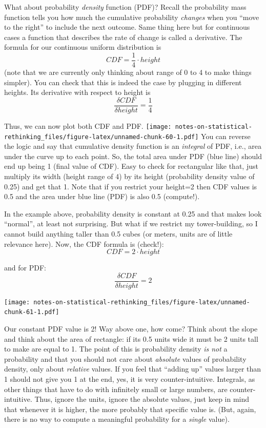 \documentclass[
]{book}
\begin{document}
What about probability \emph{density} function (PDF)? Recall the probability mass function tells you how much the cumulative probability \emph{changes} when you ``move to the right'' to include the next outcome. Same thing here but for continuous cases a function that describes the rate of change is called a derivative. The formula for our continuous uniform distribution is
\[CDF = \frac{1}{4} \cdot height\]
(note that we are currently only thinking about range of 0 to 4 to make things simpler). You can check that this is indeed the case by plugging in different heights. Its derivative with respect to height is
\[\frac{\delta CDF}{\delta height} = \frac{1}{4}\]

Thus, we can now plot both CDF and PDF.
\texttt{[image: notes-on-statistical-rethinking\_files/figure-latex/unnamed-chunk-60-1.pdf]}
You can reverse the logic and say that cumulative density function is an \emph{integral} of PDF, i.e., area under the curve up to each point. So, the total area under PDF (blue line) should end up being 1 (final value of CDF). Easy to check for rectangular like that, just multiply its width (height range of 4) by its height (probability density value of 0.25) and get that 1. Note that if you restrict your height=2 then CDF values is 0.5 and the area under blue line (PDF) is also 0.5 (compute!).

In the example above, probability density is constant at 0.25 and that makes look ``normal'', at least not surprising. But what if we restrict my tower-building, so I cannot build anything taller than 0.5 cubes (or meters, units are of little relevance here). Now, the CDF formula is (check!):
\[CDF = 2 \cdot height\]

and for PDF:
\[\frac{\delta CDF}{\delta height} = 2\]

\texttt{[image: notes-on-statistical-rethinking\_files/figure-latex/unnamed-chunk-61-1.pdf]}

Our constant PDF value is 2! Way above one, how come? Think about the slope and think about the area of rectangle: if its 0.5 units wide it must be 2 units tall to make are equal to 1. The point of this is probability density \emph{is not} a probability and that you should not care about \emph{absolute} values of probability density, only about \emph{relative} values. If you feel that ``adding up'' values larger than 1 should not give you 1 at the end, yes, it is very counter-intuitive. Integrals, as other things that have to do with infinitely small or large numbers, are counter-intuitive. Thus, ignore the units, ignore the absolute values, just keep in mind that whenever it is higher, the more probably that specific value is. (But, again, there is no way to compute a meaningful probability for a \emph{single} value).

  
\end{document}
